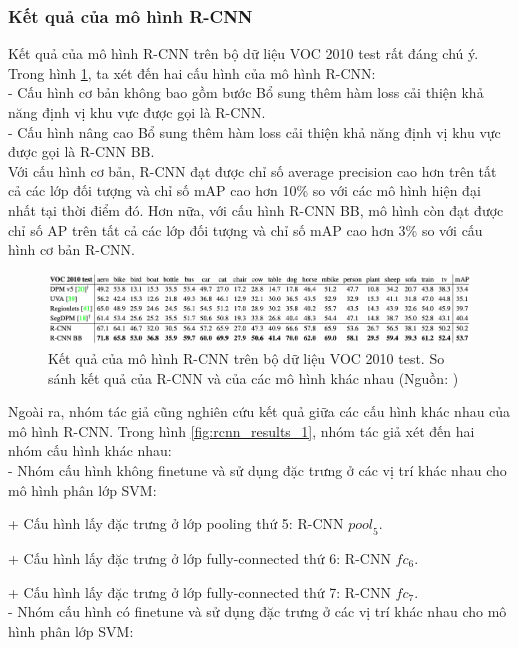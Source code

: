 {    \subsubsection{Kết quả của mô hình R-CNN}
    Kết quả của mô hình R-CNN trên bộ dữ liệu VOC 2010 test rất đáng chú ý.
    Trong hình \ref{fig:rcnn_results_3}, ta xét đến hai cấu hình của mô hình R-CNN: \\
    - Cấu hình cơ bản không bao gồm bước Bổ sung thêm hàm loss cải thiện khả năng định vị khu vực được gọi là R-CNN. \\
    - Cấu hình nâng cao Bổ sung thêm hàm loss cải thiện khả năng định vị khu vực được gọi là R-CNN BB. \\
    Với cấu hình cơ bản, R-CNN đạt được chỉ số average precision cao hơn trên tất cả các lớp đối tượng  và chỉ số mAP cao hơn 10\% so với các mô hình hiện đại nhất tại thời điểm đó.
    Hơn nữa, với cấu hình R-CNN BB, mô hình còn đạt được chỉ số AP trên tất cả các lớp đối tượng  và chỉ số mAP cao hơn 3\% so với cấu hình cơ bản R-CNN.
    \begin{figure}[H]
        \centering
        \includegraphics[width=15cm] {images/rcnn_results_3}
        \caption{Kết quả của mô hình R-CNN trên bộ dữ liệu VOC 2010 test. So sánh kết quả của R-CNN và của các mô hình khác nhau (Nguồn: \cite{girshick2014rich})}
        \label{fig:rcnn_results_3}
    \end{figure}
    \noindent
    Ngoài ra, nhóm tác giả cũng nghiên cứu kết quả giữa các cấu hình khác nhau của mô hình R-CNN.
    Trong hình \ref{fig:rcnn_results_1}, nhóm tác giả xét đến hai nhóm cấu hình khác nhau: \\
    - Nhóm cấu hình không finetune và sử dụng đặc trưng ở các vị trí khác nhau cho mô hình phân lớp SVM: \par
    + Cấu hình lấy đặc trưng ở lớp pooling thứ 5: R-CNN ${pool}_{5}$. \par
    + Cấu hình lấy đặc trưng ở lớp fully-connected thứ 6: R-CNN ${fc}_{6}$. \par
    + Cấu hình lấy đặc trưng ở lớp fully-connected thứ 7: R-CNN ${fc}_{7}$. \\
    - Nhóm cấu hình có finetune và sử dụng đặc trưng ở các vị trí khác nhau cho mô hình phân lớp SVM: \par
}
